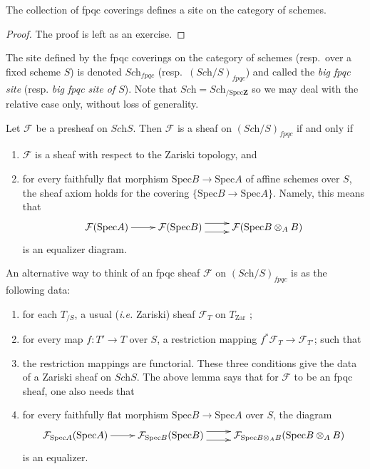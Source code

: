 \begin{lemma}
\label{lemma-site-fpqc}
The collection of fpqc coverings defines a site on the category of schemes.
\end{lemma}

\begin{proof}
The proof is left as an exercise.
\end{proof}

\begin{definition}
\label{definition-fpqc-site}
The site defined by the fpqc coverings on the category of schemes 
(resp.\ over a fixed scheme $S$) is denoted $\textit{Sch}_{fpqc}$
(resp.\ $(\textit{Sch}/S)_{fpqc}$) and called the
{\it big fpqc site} (resp. {\it big fpqc site of $S$}).
Note that $\textit{Sch} = \textit{Sch}_{/\text{Spec}\mathbf{Z}}$ so we 
may deal with the relative case only, without loss of generality. 
\end{definition}

\begin{lemma}
\label{lemma-fpqc-sheaves}
Let $\mathcal{F}$ be a presheaf on $\textit{Sch}S$. Then $\mathcal{F}$ is a 
sheaf on $(\textit{Sch}/S)_{fpqc}$ if and only if
\begin{enumerate}
\item $\mathcal{F}$ is a sheaf with respect to the Zariski topology, and
\item for every faithfully flat morphism $\text{Spec} B \to \text{Spec} A$ of 
affine schemes over $S$, the sheaf axiom holds for the covering $\{\text{Spec} 
B \to \text{Spec} A\}$. Namely, this means that 
$$
\xymatrix{
\mathcal{F}(\text{Spec} A) \ar[r] &
\mathcal{F}(\text{Spec} B) \ar@<1ex>[r] \ar@<-1ex>[r] &
\mathcal{F}(\text{Spec} B \otimes_A B)
}
$$
is an equalizer diagram.
\end{enumerate}
\end{lemma}

\noindent
An alternative way to think of an fpqc sheaf $\mathcal{F}$ on 
$(\textit{Sch}/S)_{fpqc}$ is as the following data:
\begin{enumerate}
\item for each $T_{/S}$, a usual ({\it i.e.} Zariski) sheaf $\mathcal{F}_T$ on 
$T_{\mathrm{Zar}}$ ;
\item for every map $f : T' \to T$ over $S$, a restriction mapping $f^* 
\mathcal{F}_T \to \mathcal{F}_{T'} $; such that
\item the restriction mappings are functorial. These three conditions give the 
data of a Zariski sheaf on $\textit{Sch}S$. The above lemma says that for 
$\mathcal{F}$ to be an fpqc sheaf, one also needs that
\item for every faithfully flat morphism $\text{Spec} B \to \text{Spec} A$ over 
$S$, the diagram 
$$
\xymatrix{
\mathcal{F}_{\text{Spec} A}(\text{Spec} A) \ar[r] &
\mathcal{F}_{\text{Spec} B}(\text{Spec} B) \ar@<1ex>[r] \ar@<-1ex>[r] &
\mathcal{F}_{\text{Spec} B \otimes_A B}(\text{Spec} B \otimes_A B)
}
$$
is an equalizer.
\end{enumerate}

